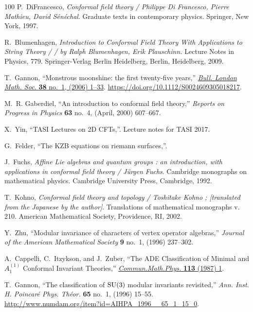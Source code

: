 \begin{thebibliography}{100}
P.~DiFrancesco, {\em Conformal field theory / Philippe Di Francesco, Pierre
  Mathieu, David Sénéchal}.
\newblock Graduate texts in contemporary physics. Springer, New York, 1997.

R.~Blumenhagen, {\em Introduction to Conformal Field Theory With Applications
  to String Theory / / by Ralph Blumenhagen, Erik Plauschinn.}
\newblock Lecture Notes in Physics, 779. Springer-Verlag Berlin Heidelberg,
  Berlin, Heidelberg, 2009.

T.~Gannon, ``Monstrous moonshine: the first twenty-five years,''
  \href{http://dx.doi.org/10.1112/S0024609305018217}{{\em Bull. London Math.
  Soc.} {\bfseries 38} no.~1, (2006) 1--33}.
  \url{https://doi.org/10.1112/S0024609305018217}.

M.~R. Gaberdiel, ``An introduction to conformal field theory,'' {\em Reports on
  Progress in Physics} {\bfseries 63} no.~4, (April, 2000) 607--667.

X.~Yin, ``{TASI Lectures on 2D CFTs},''. Lecture notes for TASI 2017.

G.~Felder, ``The {KZB} equations on riemann surfaces,''.

J.~Fuchs, {\em Affine Lie algebras and quantum groups : an introduction, with
  applications in conformal field theory / Jürgen Fuchs}.
\newblock Cambridge monographs on mathematical physics. Cambridge University
  Press, Cambridge, 1992.

T.~Kohno, {\em Conformal field theory and topology / Toshitake Kohno ;
  [translated from the Japanese by the author]}.
\newblock Translations of mathematical monographs v. 210. American Mathematical
  Society, Providence, RI, 2002.

Y.~Zhu, ``Modular invariance of characters of vertex operator algebras,'' {\em
  Journal of the American Mathematical Society} {\bfseries 9} no.~1, (1996)
  237--302.

A.~Cappelli, C.~Itzykson, and J.~Zuber, ``{The ADE Classification of Minimal
  and $A_1^{(1)}$ Conformal Invariant Theories},''
\href{http://dx.doi.org/10.1007/BF01221394}{{\em Commun.Math.Phys.} {\bfseries
  113} (1987) 1}.

T.~Gannon, ``The classification of {${\rm SU}(3)$} modular invariants
  revisited,'' {\em Ann. Inst. H. Poincar\'e Phys. Th\'eor.} {\bfseries 65}
  no.~1, (1996) 15--55.
  \url{http://www.numdam.org/item?id=AIHPA_1996__65_1_15_0}.


\end{thebibliography}
